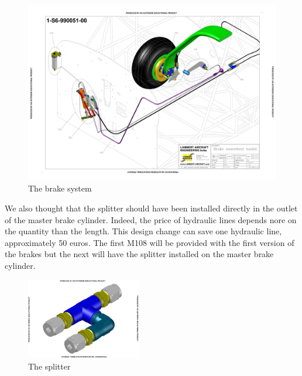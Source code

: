 \documentclass[11pt,a4paper]{article}
\begin{document}
\begin{figure}[ht!]
	\begin{center}
		\includegraphics[width=15cm,trim = 1.5cm 2.5cm 1.5cm 2.5cm, clip]{pics/PIC019.pdf}
		\caption{The brake system}
		\label{fig:PIC019}
	\end{center}
\end{figure}

We also thought that the splitter should have been installed directly in the outlet of the master brake cylinder. Indeed, the price of hydraulic lines depends nore on the quantity than the length. This design change can save one hydraulic line, approximately 50 euros. The first M108 will be provided with the first version of the brakes but the next will have the splitter installed on the master brake cylinder.
\begin{figure}[ht!]
	\begin{center}
		\includegraphics[width=5cm,trim = 1cm 1cm 1cm 1cm, clip]{pics/PIC020.pdf}
		\caption{The splitter}
		\label{fig:PIC020}
	\end{center}
\end{figure}

\newpage
\end{document}
